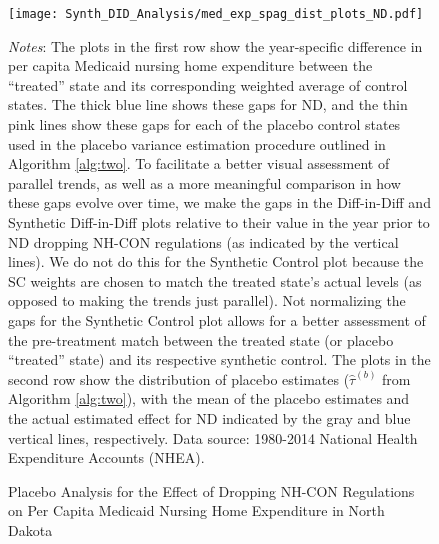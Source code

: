 \documentclass[../Main.tex]{subfiles}
\begin{document}
\newpage
\begin{figure}[t]
	\begin{center}
	\caption{\label{fig: med_exp_spag_plots_nd} \centering Placebo Analysis for the Effect of Dropping NH-CON Regulations on Per Capita Medicaid Nursing Home Expenditure in North Dakota}
    \texttt{[image: Synth\_DID\_Analysis/med\_exp\_spag\_dist\_plots\_ND.pdf]}
    \end{center}
    \footnotesize
		\textit{Notes}: The plots in the first row show the year-specific difference in per capita Medicaid nursing home expenditure between the ``treated'' state and its corresponding weighted average of control states. The thick blue line shows these gaps for ND, and the thin pink lines show these gaps for each of the placebo control states used in the placebo variance estimation procedure outlined in Algorithm \ref{alg:two}. To facilitate a better visual assessment of parallel trends, as well as a more meaningful comparison in how these gaps evolve over time, we make the gaps in the Diff-in-Diff and Synthetic Diff-in-Diff plots relative to their value in the year prior to ND dropping NH-CON regulations (as indicated by the vertical lines). We do not do this for the Synthetic Control plot because the SC weights are chosen to match the treated state's actual levels (as opposed to making the trends just parallel). Not normalizing the gaps for the Synthetic Control plot allows for a better assessment of the pre-treatment match between the treated state (or placebo ``treated'' state) and its respective synthetic control. The plots in the second row show the distribution of placebo estimates ($\hat{\tau}^{(b)}$ from Algorithm \ref{alg:two}), with the mean of the placebo estimates and the actual estimated effect for ND indicated by the gray and blue vertical lines, respectively. Data source: 1980-2014 National Health Expenditure Accounts (NHEA).
\end{figure}
\clearpage
\end{document}
